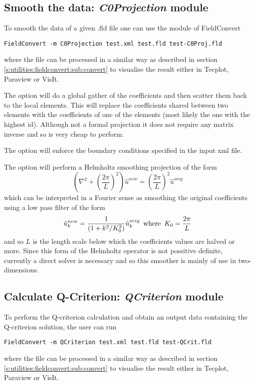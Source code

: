 \subsection{Smooth the data: \textit{C0Projection} module}
To smooth the data of a given .fld file one can
use the  module of FieldConvert
%
\begin{lstlisting}[style=BashInputStyle]
FieldConvert -m C0Projection test.xml test.fld test-C0Proj.fld
\end{lstlisting}
%
where the file  can be processed in a similar
way as described in section \ref{s:utilities:fieldconvert:sub:convert}
to visualise the result either in Tecplot, Paraview or VisIt.

The option  will do a global gather of the
coefficients and then scatter them back to the local elements. This
will replace the coefficients shared between two elements with the
coefficients of one of the elements (most likely the one with the
highest id). Although not a formal projection it does not require any
matrix inverse and so is very cheap to perform.

The option  will enforce the boundary conditions
specified in the input xml file.

The option  will perform a Helmholtz
smoothing projection of the form
\[
\left (\nabla^2 + \left (\frac{2 \pi}{L}\right )^2 \right ) \hat{u}^{new} =
\left (\frac{2 \pi}{L}\right )^2 \hat{u}^{orig}
\]
which can be interpreted in a Fourier sense as smoothing the original
coefficients using a low pass filter of the form
\[
\hat{u}_k^{new} = \frac{1}{(1 + k^2/K_0^2)} \hat{u}_k^{orig} \mbox{\,  where  \,}
K_0 = \frac{2 \pi}{L}
\]
and so $L$ is the length scale below which the coefficients values are
halved or more. Since this form of the Helmholtz operator is not
possitive definite, currently a direct solver is necessary and so this
smoother is mainly of use in two-dimensions.

\subsection{Calculate Q-Criterion: \textit{QCriterion} module}
To perform the Q-criterion calculation and obtain an output
data containing the Q-criterion solution, the user can run
%
\begin{lstlisting}[style=BashInputStyle]
FieldConvert -m QCriterion test.xml test.fld test-QCrit.fld
\end{lstlisting}
%
where the file  can be processed in a similar
way as described in section \ref{s:utilities:fieldconvert:sub:convert}
to visualise the result either in Tecplot, Paraview or VisIt.
%
%
%

